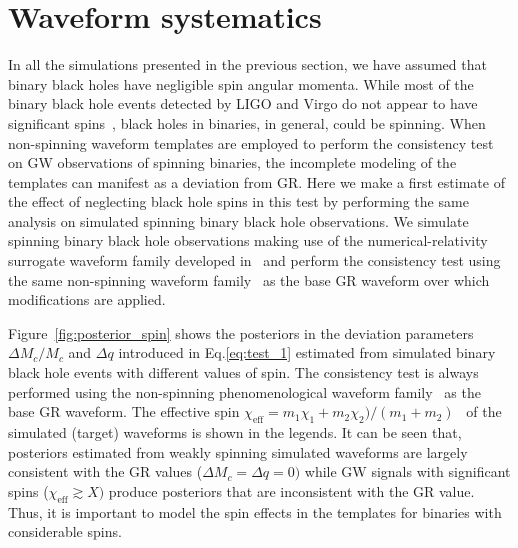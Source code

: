 \documentclass[prd,preprintnumbers,twocolumn,eqsecnum,floatfix,a4paper,nofootinbib,superscriptaddress]{revtex4}
\begin{document}
\section{Waveform systematics}
\label{sec:waveformsyst}

In all the simulations presented in the previous section, we have assumed that binary black holes have negligible spin angular momenta. While most of the binary black hole events detected by LIGO and Virgo do not appear to have significant spins~\cite{GWTC1}, black holes in binaries, in general, could be spinning. When non-spinning waveform templates are employed to perform the consistency test on GW observations of spinning binaries, the incomplete modeling of the templates can manifest as a deviation from GR. Here we make a first estimate of the effect of neglecting black hole spins in this test by performing the same analysis on simulated spinning binary black hole observations. We simulate spinning binary black hole observations making use of the numerical-relativity surrogate waveform family developed in~\cite{Varma2019} and perform the consistency test using the same non-spinning waveform family~\cite{Mehta} as the base GR waveform over which modifications are applied. 

Figure~\ref{fig:posterior_spin} shows the posteriors in the deviation parameters $\Delta M_c/M_c$ and $\Delta q$ introduced in Eq.\eqref{eq:test_1} estimated from simulated binary black hole events with different values of spin. The consistency test is always performed using the non-spinning phenomenological waveform family~\cite{Mehta} as the base GR waveform. The effective spin $\chi_\mathrm{eff} = m_1 \chi_1 + m_2 \chi_2)/(m_1+m_2)$~\cite{chieff} of the simulated (target) waveforms is shown in the legends. It can be seen that, posteriors estimated from weakly spinning simulated waveforms are largely consistent with the GR values ($\Delta M_c = \Delta q = 0)$ while GW signals with significant spins ($\chi_\mathrm{eff} \gtrsim X)$ produce posteriors that are inconsistent with the GR value. Thus, it is important to model the spin effects in the templates for binaries with considerable spins. 
\end{document}
